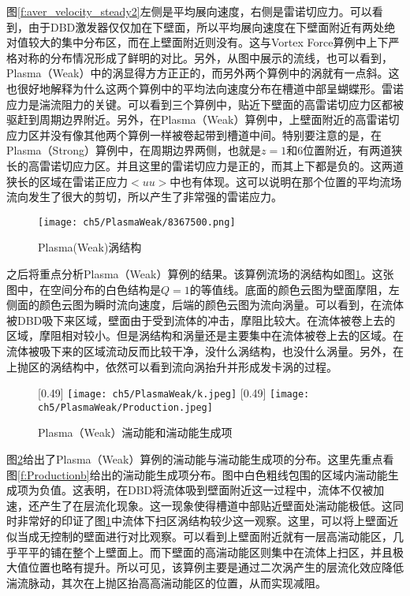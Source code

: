 图\ref{f:aver_velocity_steady2}左侧是平均展向速度，右侧是雷诺切应力。可以看到，由于DBD激发器仅仅加在下壁面，所以平均展向速度在下壁面附近有两处绝对值较大的集中分布区，而在上壁面附近则没有。这与Vortex Force算例中上下严格对称的分布情况形成了鲜明的对比。另外，从图中展示的流线，也可以看到，Plasma（Weak）中的涡显得方方正正的，而另外两个算例中的涡就有一点斜。这也很好地解释为什么这两个算例中的平均法向速度分布在槽道中部呈蝴蝶形。雷诺应力是湍流阻力的关键。可以看到三个算例中，贴近下壁面的高雷诺切应力区都被驱赶到周期边界附近。另外，在Plasma（Weak）算例中，上壁面附近的高雷诺切应力区并没有像其他两个算例一样被卷起带到槽道中间。特别要注意的是，在Plasma（Strong）算例中，在周期边界两侧，也就是$z=1$和6位置附近，有两道狭长的高雷诺切应力区。并且这里的雷诺切应力是正的，而其上下都是负的。这两道狭长的区域在雷诺正应力$<uu>$中也有体现。这可以说明在那个位置的平均流场流向发生了很大的剪切，所以产生了非常强的雷诺应力。

\begin{figure}[htb]
  \centering
  \texttt{[image: ch5/PlasmaWeak/8367500.png]}
  \caption{Plasma(Weak)涡结构}\label{f:PlasmaWeak_vortexstructure}
\end{figure}
之后将重点分析Plasma（Weak）算例的结果。该算例流场的涡结构如图\ref{f:PlasmaWeak_vortexstructure}。这张图中，在空间分布的白色结构是$Q=1$的等值线。底面的颜色云图为壁面摩阻，左侧面的颜色云图为瞬时流向速度，后端的颜色云图为流向涡量。可以看到，在流体被DBD吸下来区域，壁面由于受到流体的冲击，摩阻比较大。在流体被卷上去的区域，摩阻相对较小。但是涡结构和涡量还是主要集中在流体被卷上去的区域。在流体被吸下来的区域流动反而比较干净，没什么涡结构，也没什么涡量。另外，在上抛区的涡结构中，依然可以看到流向涡抬升并形成发卡涡的过程。

\begin{figure}
  \centering
  [0.49\textwidth]
    {\texttt{[image: ch5/PlasmaWeak/k.jpeg]}}
  [0.49\textwidth]
    {\texttt{[image: ch5/PlasmaWeak/Production.jpeg]}}
  \caption{Plasma（Weak）湍动能和湍动能生成项}\label{f:production}
\end{figure}
图\ref{f:production}给出了Plasma（Weak）算例的湍动能与湍动能生成项的分布。这里先重点看图\ref{f:Productionb}给出的湍动能生成项分布。图中白色粗线包围的区域内湍动能生成项为负值。这表明，在DBD将流体吸到壁面附近这一过程中，流体不仅被加速，还产生了在层流化现象。这一现象使得槽道中部贴近壁面处湍动能极低。这同时非常好的印证了图\ref{f:PlasmaWeak_vortexstructure}中流体下扫区涡结构较少这一观察。这里，可以将上壁面近似当成无控制的壁面进行对比观察。可以看到上壁面附近就有一层高湍动能区，几乎平平的铺在整个上壁面上。而下壁面的高湍动能区则集中在流体上扫区，并且极大值位置也略有提升。所以可见，该算例主要是通过二次涡产生的层流化效应降低湍流脉动，其次在上抛区抬高高湍动能区的位置，从而实现减阻。

